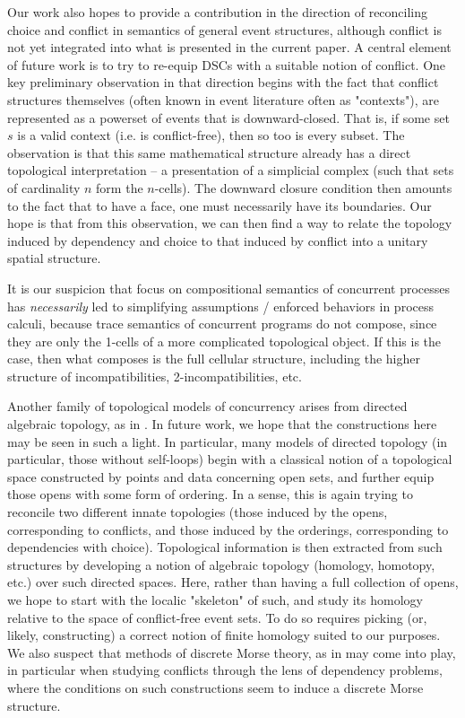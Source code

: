 \documentclass[hoptionsi,review,format=acmsmall]{acmart}
\theoremstyle{definition}
\begin{document}
Our work also hopes to provide a contribution in the direction of reconciling choice and conflict in semantics of  general event structures, although conflict is not yet integrated into what is presented in the current paper. A central element of future work is to try to re-equip DSCs with a suitable notion of conflict. One key preliminary observation in that direction begins with the fact that conflict structures themselves (often known in event literature often as "contexts"), are represented as a powerset of events that is downward-closed. That is, if some set \(s\) is a valid context (i.e. is conflict-free), then so too is every subset. The observation is that this same mathematical structure already has a direct topological interpretation -- a presentation of a simplicial complex (such that sets of cardinality \(n\) form the \(n\)-cells). The downward closure condition then amounts to the fact that to have a face, one must necessarily have its boundaries. Our hope is that from this observation, we can then find a way to relate the topology induced by dependency and choice to that induced by conflict into a unitary spatial structure.

It is our suspicion that focus on compositional semantics of concurrent processes has \textit{necessarily} led to simplifying assumptions / enforced behaviors in process calculi, because trace semantics of concurrent programs do not compose, since they are only the 1-cells of a more complicated topological object. If this is the case, then what composes is the full cellular structure, including the higher structure of incompatibilities, 2-incompatibilities, etc.

Another family of topological models of concurrency arises from directed algebraic topology, as in \cite{fajstrup2016directed}. In future work, we hope that the constructions here may be seen in such a light. In particular, many models of directed topology (in particular, those without self-loops) begin with a classical notion of a topological space constructed by points and data concerning open sets, and further equip those opens with some form of ordering. In a sense, this is again trying to reconcile two different innate topologies (those induced by the opens, corresponding to conflicts, and those induced by the orderings, corresponding to dependencies with choice). Topological information is then extracted from such structures by developing a notion of algebraic topology (homology, homotopy, etc.) over such directed spaces. Here, rather than having a full collection of opens, we hope to start with the localic "skeleton" of such, and study its homology relative to the space of conflict-free event sets. To do so requires picking (or, likely, constructing) a correct notion of finite homology suited to our purposes. We also suspect that methods of discrete Morse theory, as in \cite{forman2002user} may come into play, in particular when studying conflicts through the lens of dependency problems, where the conditions on such constructions seem to induce a discrete Morse structure.
\end{document}
